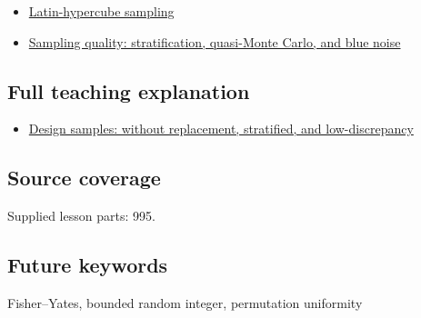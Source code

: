 \begin{itemize}
\tightlist
\item
  \hyperref[appendix-1c5e85693a06]{Latin-hypercube sampling}
\item
  \hyperref[appendix-9f693ffd82bc]{Sampling quality: stratification, quasi-Monte Carlo, and blue noise}
\end{itemize}

\subsection{Full teaching explanation}\label{full-teaching-explanation}

\begin{itemize}
\tightlist
\item
  \href{Continuous\%20Notes/Computing\%20Foundations\%20-\%20From\%20Bits\%20to\%20C++\%20and\%20Systems\%20APIs\#Design\%20samples:\%20without\%20replacement,\%20stratified,\%20and\%20low-discrepancy}{Design samples: without replacement, stratified, and low-discrepancy}
\end{itemize}

\subsection{Source coverage}\label{source-coverage}

Supplied lesson parts: 995.

\subsection{Future keywords}\label{future-keywords}

Fisher--Yates, bounded random integer, permutation uniformity
